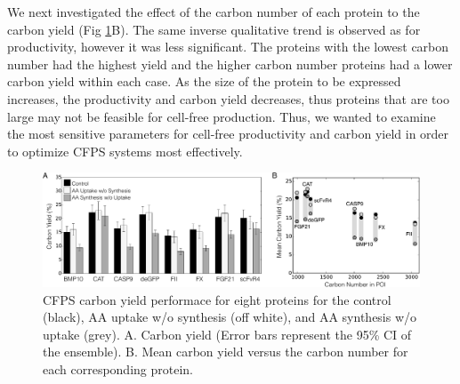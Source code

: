 \documentclass[journal=asbcd6,manuscript=article]{achemso}
\begin{document}
We next investigated the effect of the carbon number of each protein to the carbon yield (Fig \ref{fig:Yield_POI}B).
The same inverse qualitative trend is observed as for productivity, however it was less significant.
The proteins with the lowest carbon number had the highest yield and the higher carbon number proteins had a lower carbon yield within each case. 
As the size of the protein to be expressed increases, the productivity and carbon yield decreases, thus proteins that are too large may not be feasible for cell-free production.
Thus, we wanted to examine the most sensitive parameters for cell-free productivity and carbon yield in order to optimize CFPS systems most effectively.
\begin{figure}[t!]
\centering
\includegraphics[width=1.00\textwidth]{./Figures/Yield_POI.pdf}
\caption{CFPS carbon yield performace for eight proteins for the control (black), AA uptake w/o synthesis (off white), and AA synthesis w/o uptake (grey). A. Carbon yield (Error bars represent the 95\% CI of the ensemble). B. Mean carbon yield versus the carbon number for each corresponding protein.}
\label{fig:Yield_POI}
\end{figure}
\end{document}

